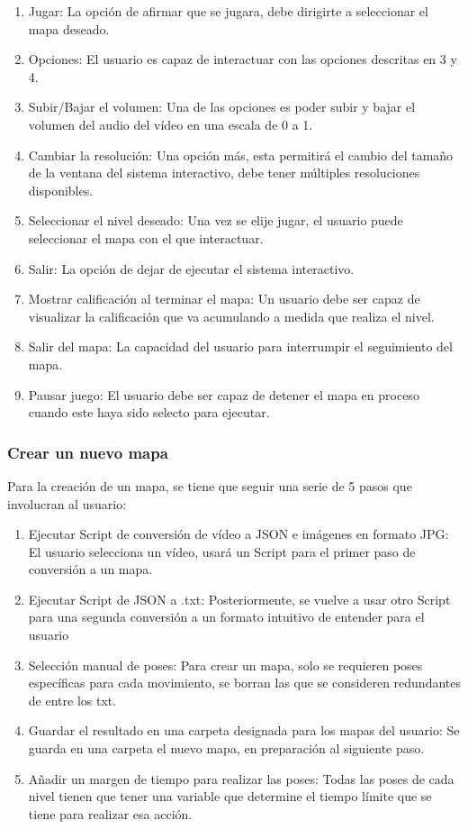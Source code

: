 \begin{enumerate}
	\item Jugar: La opción de afirmar que se jugara, debe dirigirte a seleccionar el mapa deseado.
	\item Opciones: El usuario es capaz de interactuar con las opciones descritas en 3 y 4.
	\item Subir/Bajar el volumen: Una de las opciones es poder subir y bajar el volumen del audio del vídeo en una escala de 0 a 1.
	\item Cambiar la resolución: Una opción más, esta permitirá el cambio del tamaño de la ventana del sistema interactivo, debe tener múltiples resoluciones disponibles.
	\item Seleccionar el nivel deseado: Una vez se elije jugar, el usuario puede seleccionar el mapa con el que interactuar.
	\item Salir: La opción de dejar de ejecutar el sistema interactivo.
	\item Mostrar calificación al terminar el mapa: Un usuario debe ser capaz de visualizar la calificación que va acumulando a medida que realiza el nivel.
	\item Salir del mapa: La capacidad del usuario para interrumpir el seguimiento del mapa.
	\item Pausar juego: El usuario debe ser capaz de detener el mapa en proceso cuando este haya sido selecto para ejecutar.
\end{enumerate}

\subsubsection{Crear un nuevo mapa}

Para la creación de un mapa, se tiene que seguir una serie de 5 pasos que involucran al usuario:

\begin{enumerate}
	\item Ejecutar Script de conversión de vídeo a JSON e imágenes en formato JPG: El usuario selecciona un vídeo, usará un Script para el primer paso de conversión a un mapa.
	\item Ejecutar Script de JSON a .txt: Posteriormente, se vuelve a usar otro Script para una segunda conversión a un formato intuitivo de entender para el usuario
	\item Selección manual de poses: Para crear un mapa, solo se requieren poses específicas para cada movimiento, se borran las que se consideren redundantes de entre los txt.
	\item Guardar el resultado en una carpeta designada para los mapas del usuario: Se guarda en una carpeta el nuevo mapa, en preparación al siguiente paso.
	\item Añadir un margen de tiempo para realizar las poses: Todas las poses de cada nivel tienen que tener una variable que determine el tiempo límite que se tiene para realizar esa acción. 
\end{enumerate}

